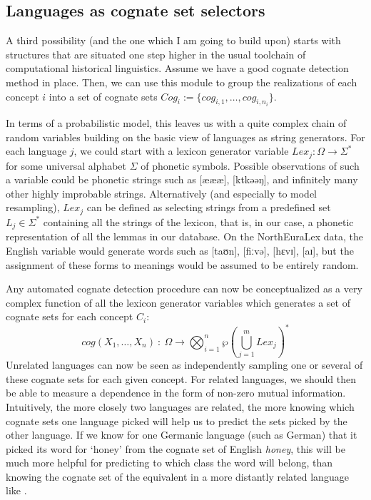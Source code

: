 \subsection{Languages as cognate set selectors}
A third possibility (and the one which I am going to build upon) starts with structures that are situated one step higher in the usual toolchain of computational historical linguistics. Assume we have a good cognate detection method in place. Then, we can use this module to group the realizations of each concept $i$ into a set of cognate sets $Cog_i := \{cog_{i,1}, \dots, cog_{i,n_{i}}\}$.

In terms of a probabilistic model, this leaves us with a quite complex chain of random variables building on the basic view of languages as string generators. For each language $j$, we could start with a lexicon generator variable $Lex_j \colon \Omega \rightarrow \Sigma^*$ for some universal alphabet $\Sigma$ of phonetic symbols. Possible observations of such a variable could be phonetic strings such as [æææ], [ktkəəŋ], and infinitely many other highly improbable strings. Alternatively (and especially to model resampling), $Lex_j$ can be defined as selecting strings from a predefined set $L_j \in \Sigma^*$ containing all the strings of the lexicon, that is, in our case, a phonetic representation of all the lemmas in our database. On the NorthEuraLex data, the English variable would generate words such as [taʊn], [fiːvə], [hɛvɪ], [aɪ], but the assignment of these forms to meanings would be assumed to be entirely random.

Any automated cognate detection procedure can now be conceptualized as a very complex function of all the lexicon generator variables which generates a set of cognate sets for each concept $C_i$:
\begin{equation*}
 cog(X_1,\dots,X_n)\ \colon\ \Omega \rightarrow \bigotimes_{i = 1}^{n} \wp\left(\bigcup_{j=1}^{m} Lex_j\right)^*
\end{equation*}
Unrelated languages can now be seen as independently sampling one or several of these cognate sets for each given concept. For related languages, we should then be able to measure a dependence in the form of non-zero mutual information. Intuitively, the more closely two languages are related, the more knowing which cognate sets one language picked will help us to predict the sets picked by the other language. If we know for one Germanic language (such as German) that it picked its word for `honey' from the cognate set of English \textit{honey}, this will be much more helpful for predicting to which class the  word will belong, than knowing the cognate set of the equivalent in a more distantly related language like .


